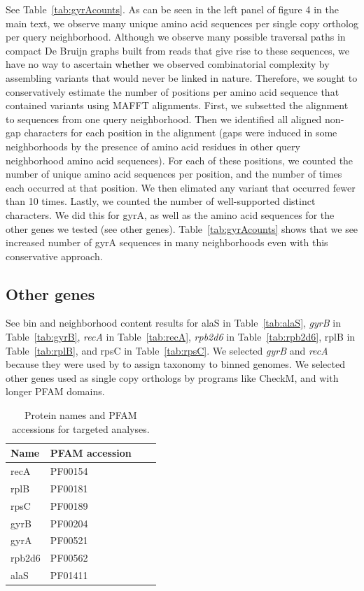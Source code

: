 See Table~\ref{tab:gyrAcounts}. As can be seen in the left panel of figure 4 in the
main text, we observe many unique amino acid sequences per single copy ortholog
per query neighborhood.
Although we observe many possible traversal paths in compact De Bruijn graphs built
from reads that give rise to these sequences, we have no way to ascertain whether we
observed combinatorial complexity by assembling variants that would never be linked
in nature. Therefore, we sought to conservatively estimate the number of positions
per amino acid sequence that contained variants using MAFFT alignments. First, we
subsetted the alignment to sequences from one query neighborhood. Then we identified
all aligned non-gap characters for each position in the alignment (gaps were induced
in some neighborhoods by the presence of amino acid residues in other query neighborhood
amino acid sequences). For each of these positions, we counted the number of unique
amino acid sequences per position, and the number of times each occurred at that position.
We then elimated any variant that occurred fewer than 10 times. Lastly, we counted the
number of well-supported distinct characters. We did this for gyrA, as well as the
amino acid sequences for the other genes we tested (see other genes). Table~\ref{tab:gyrAcounts}
shows that we see increased number of gyrA sequences in many neighborhoods even with
this conservative approach.

\subsection{Other genes}

\label{subsec:othergenes}

See bin and neighborhood content results for alaS in Table~\ref{tab:alaS}, {\em gyrB} in
Table~\ref{tab:gyrB}, {\em recA} in Table~\ref{tab:recA}, {\em rpb2d6} in Table~\ref{tab:rpb2d6},
rplB in Table~\ref{tab:rplB}, and rpsC in Table~\ref{tab:rpsC}. We selected {\em gyrB} and
{\em recA} because they were used by \hu to assign taxonomy to binned genomes. We selected
other genes used as single copy orthologs by programs like CheckM, and with longer PFAM
domains.


\begin{table}
  \begin{tabular}{l l c c }
    \toprule
    Name & PFAM accession \\
    \midrule
    recA & PF00154 \\
    rplB & PF00181 \\
    rpsC & PF00189 \\
    gyrB & PF00204 \\
    gyrA & PF00521 \\
    rpb2d6 & PF00562 \\
    alaS & PF01411 \\
    \hline
    \bottomrule
  \end{tabular}
  \caption{Protein names and PFAM accessions for targeted analyses.}
  \label{tab:pfam_accessions}
\end{table}

